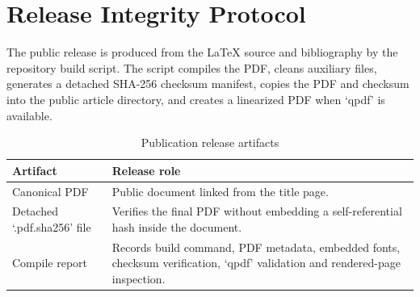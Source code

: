 \documentclass[11pt,a4paper,oneside,parskip=false]{scrartcl}
\begin{document}
\section{Release Integrity Protocol}
\label{appendix:release-integrity}

The public release is produced from the LaTeX source and bibliography by the repository build script. The script compiles the PDF, cleans auxiliary files, generates a detached SHA-256 checksum manifest, copies the PDF and checksum into the public article directory, and creates a linearized PDF when `qpdf' is available.

\begin{table}[htbp]
\centering
\caption{Publication release artifacts}
\label{tab:release-artifacts}
\small
\begin{tabularx}{\textwidth}{L{0.30\textwidth}Y}
\toprule
\textbf{Artifact} & \textbf{Release role} \\
\midrule
Canonical PDF & Public document linked from the title page. \\
Detached `.pdf.sha256' file & Verifies the final PDF without embedding a self-referential hash inside the document. \\
Compile report & Records build command, PDF metadata, embedded fonts, checksum verification, `qpdf' validation and rendered-page inspection. \\
\bottomrule
\end{tabularx}
\end{table}
\end{document}
